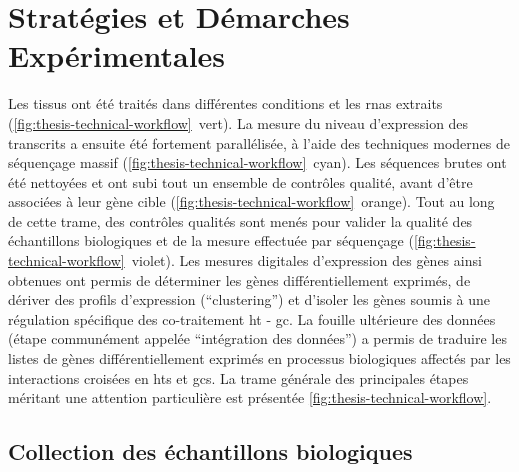\documentclass[../main.tex]{subfiles}
\begin{document}
\chapter{Stratégies et Démarches Expérimentales}

Les tissus ont été traités dans différentes conditions et les \glspl{rna} extraits (\autoref{fig:thesis-technical-workflow}~vert).
La mesure du niveau d'expression des transcrits a ensuite été fortement parallélisée, à l'aide des techniques modernes de séquençage massif (\autoref{fig:thesis-technical-workflow}~cyan).
Les séquences brutes ont été nettoyées et ont subi tout un ensemble de contrôles qualité, avant d'être associées à leur gène cible (\autoref{fig:thesis-technical-workflow}~orange).
Tout au long de cette trame, des contrôles qualités sont menés pour valider la qualité des échantillons biologiques et de la mesure effectuée par séquençage (\autoref{fig:thesis-technical-workflow}~violet).
Les mesures digitales d'expression des gènes ainsi obtenues ont permis de déterminer les gènes différentiellement exprimés, de dériver des profils d'expression (``clustering'') et d'isoler les gènes soumis à une régulation spécifique des co-traitement \gls{ht} - \gls{gc}.
La fouille ultérieure des données (étape communément appelée ``intégration des données'') a permis de traduire les listes de gènes différentiellement exprimés en processus biologiques affectés par les interactions croisées en \glspl{ht} et \glspl{gc}.
La trame générale des principales étapes méritant une attention particulière est présentée \autoref{fig:thesis-technical-workflow}.





\section{Collection des échantillons biologiques}\label{sec:col-bio-samples}
\end{document}
